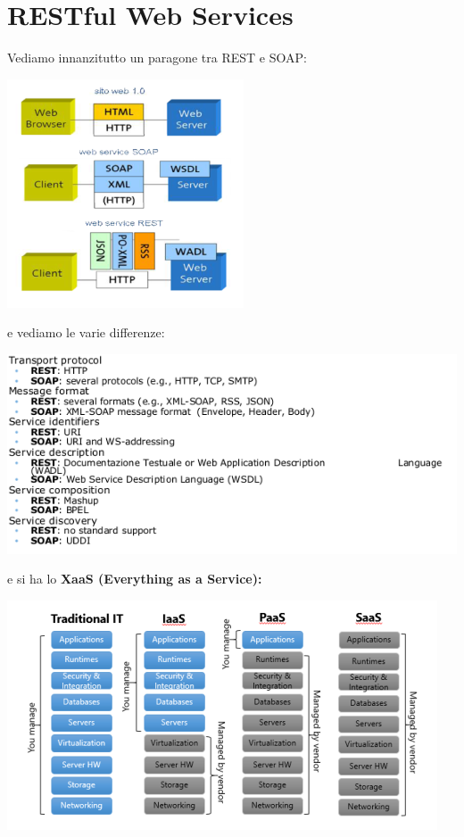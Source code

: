 \documentclass[a4paper,12pt, oneside]{book}
\begin{document}
\section{RESTful Web Services}
Vediamo innanzitutto un paragone tra REST e SOAP:
\begin{center}
\includegraphics[scale=0.6]{img/rest.png}
\end{center}
e vediamo le varie differenze:
\begin{center}
\includegraphics[scale=0.6]{img/rest2.png}
\end{center}
e si ha lo \textbf{XaaS (Everything as a Service):}
\begin{center}
\includegraphics[scale=0.6]{img/xaas2.png}
\end{center}
\end{document}
